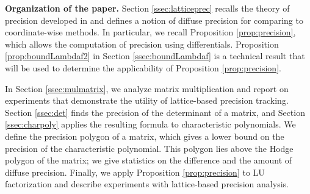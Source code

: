 \documentclass{sig-alternate}
\newcommand{\Q}{\mathbb Q}
\begin{document}
\begin{comment}
The present paper, which may be considered as a continuation of 
\cite{caruso-roe-vaccon:14a}, aims at using the theory of \emph{loc.~cit.} in order to analyze the $p$-adic stability of many standard 
algorithms for computing with basic algebraic structures: numbers, 
matrices, univariate polynomials and vector spaces. For each considered 
algorithm, we will follow the same protocol: 
first, we will compute the theoretical loss of precision of the 
underlying question using the framework of \cite{caruso-roe-vaccon:14a} 
and then compare it to those observed in available implementations in 
\textsc{pari} \cite{pari}, \textsc{magma} \cite{magma} and/or 
\textsc{sage} \cite{sage}.

The conclusion of our analysis is that generic algorithms which are 
designed to work over an arbitrary field are often quite unstable. Very 
roughly, denoting by $D$ the number of divisions performed by the 
algorithm under analysis and by $q$ the cardinality of the residue 
field, it appears that the numbers of lost digits is about $O(\frac D 
q)$ whereas the theoretical loss of precision is closer than $O(\log_q 
D)$ --- and sometimes even $O(1)$. We would like to underline in 
particular that the instability phenomena are much more apparent when 
the residue field is small. It is the reason why we will always take
$K = \Q_2$ is our examples.
\end{comment}

\smallskip

\noindent
{\bf Organization of the paper.}
Section \ref{ssec:latticeprec} recalls the theory of 
precision developed in \cite{caruso-roe-vaccon:14a} and defines
a notion of diffuse precision for comparing to coordinate-wise methods.
In particular, we recall Proposition \ref{prop:precision}, which
allows the computation of precision using differentials.
Proposition \ref{prop:boundLambdaf2} in Section \ref{ssec:boundLambdaf}
is a technical result that will be used to determine the applicability of
Proposition \ref{prop:precision}.

In Section \ref{ssec:mulmatrix}, we analyze matrix multiplication and report
on experiments that demonstrate the utility of lattice-based precision tracking.
Section \ref{ssec:det} finds the precision of the determinant of a
matrix, and Section \ref{ssec:charpoly} applies the resulting formula to
characteristic polynomials.  We define the precision polygon of a matrix, which
gives a lower bound on the precision of the characteristic polynomial.
This polygon lies above the Hodge polygon of the matrix;
we give statistics on the difference and the amount of diffuse precision.
Finally, we apply Proposition \ref{prop:precision} to LU factorization and
describe experiments with lattice-based precision analysis.
\end{document}
